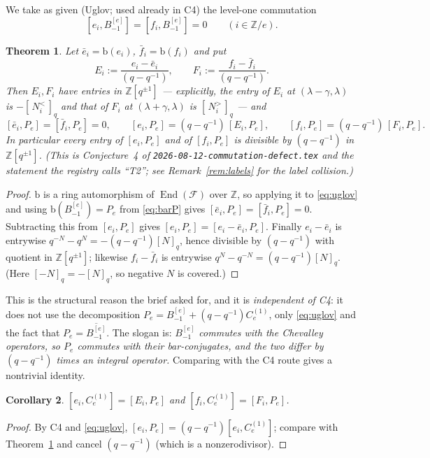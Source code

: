 \documentclass[11pt]{article}
\theoremstyle{plain}
\newtheorem{theorem}{Theorem}
\newtheorem{corollary}[theorem]{Corollary}
\theoremstyle{definition}
\DeclareMathOperator{\End}{End}
\newcommand{\F}{\mathcal{F}}
\newcommand{\qq}{(q-q^{-1})}
\newcommand{\Bm}{B_{-1}^{[e]}}
\newcommand{\Ce}{C_e^{(1)}}
\begin{document}
We take as given (Uglov; used already in C4) the level-one commutation
\begin{equation}\label{eq:uglov}
  [e_i,\Bm]=[f_i,\Bm]=0 \qquad (i\in\mathbb{Z}/e).
\end{equation}

\begin{theorem}\label{thm:t2}
Let $\bar e_i=\mathrm{b}(e_i)$, $\bar f_i=\mathrm{b}(f_i)$ and put
\[
  E_i:=\frac{e_i-\bar e_i}{\qq},\qquad F_i:=\frac{f_i-\bar f_i}{\qq}.
\]
Then $E_i,F_i$ have entries in $\mathbb{Z}[q^{\pm1}]$ --- explicitly, the
entry of $E_i$ at $(\lambda-\gamma,\lambda)$ is $-[\,N^{<}_i\,]_q$ and that of
$F_i$ at $(\lambda+\gamma,\lambda)$ is $[\,N^{>}_i\,]_q$ --- and
\[
  [\bar e_i,P_e]=[\bar f_i,P_e]=0,
  \qquad
  [e_i,P_e]=\qq\,[E_i,P_e],
  \qquad
  [f_i,P_e]=\qq\,[F_i,P_e].
\]
In particular every entry of $[e_i,P_e]$ and of $[f_i,P_e]$ is divisible by
$\qq$ in $\mathbb{Z}[q^{\pm1}]$.  (This is Conjecture~4 of
\texttt{2026-08-12-commutation-defect.tex} and the statement the registry
calls ``T2''; see Remark~\ref{rem:labels} for the label collision.)
\end{theorem}

\begin{proof}
$\mathrm{b}$ is a ring automorphism of $\End(\F)$ over $\mathbb{Z}$, so
applying it to \eqref{eq:uglov} and using $\mathrm{b}(\Bm)=P_e$ from
\eqref{eq:barP} gives $[\bar e_i,P_e]=[\bar f_i,P_e]=0$.  Subtracting this
from $[e_i,P_e]$ gives $[e_i,P_e]=[e_i-\bar e_i,P_e]$.  Finally $e_i-\bar e_i$
is entrywise $q^{-N}-q^{N}=-\qq[N]_q$, hence divisible by $\qq$ with quotient
in $\mathbb{Z}[q^{\pm1}]$; likewise $f_i-\bar f_i$ is entrywise
$q^{N}-q^{-N}=\qq[N]_q$.  (Here $[-N]_q=-[N]_q$, so negative $N$ is covered.)
\end{proof}

This is the structural reason the brief asked for, and it is
\emph{independent of C4}: it does not use the decomposition
$P_e=\Bm+\qq\Ce$, only \eqref{eq:uglov} and the fact that $P_e=\overline{\Bm}$.
The slogan is: \emph{$\Bm$ commutes with the Chevalley operators, so $P_e$
commutes with their bar-conjugates, and the two differ by $\qq$ times an
integral operator.}  Comparing with the C4 route gives a nontrivial identity.

\begin{corollary}\label{cor:tworoutes}
$[e_i,\Ce]=[E_i,P_e]$ and $[f_i,\Ce]=[F_i,P_e]$.
\end{corollary}
\begin{proof}
By C4 and \eqref{eq:uglov}, $[e_i,P_e]=\qq[e_i,\Ce]$; compare with
Theorem~\ref{thm:t2} and cancel $\qq$ (which is a nonzerodivisor).
\end{proof}
\end{document}
